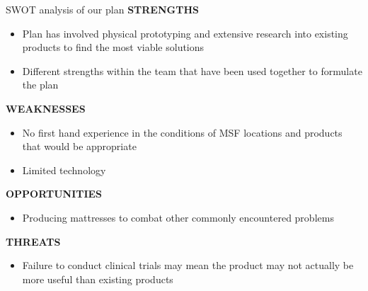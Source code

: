 \documentclass[final]{beamer}
\newlength{\onecolwid}
\begin{document}
\begin{frame}
\begin{columns}[t]
\begin{column}{\onecolwid}
\begin{block}{SWOT analysis of our plan}
\textbf{STRENGTHS}
\begin{itemize}
\item Plan has involved physical prototyping and extensive research into existing products to find the most viable solutions 
\item Different strengths within the team that have been used together to formulate the plan
\end{itemize}
\textbf{WEAKNESSES }
\begin{itemize}
\item No first hand experience in the conditions of MSF locations and products that would be appropriate
\item Limited technology 
\end{itemize}
\textbf{OPPORTUNITIES }
\begin{itemize}
\item Producing mattresses to combat other commonly encountered problems
\end{itemize}
\textbf{THREATS }
\begin{itemize}
\item Failure to conduct clinical trials may mean the product may not actually be more useful than existing products 
\end{itemize}
\end{block}







\end{column}
\end{columns}
\end{frame}
\end{document}

